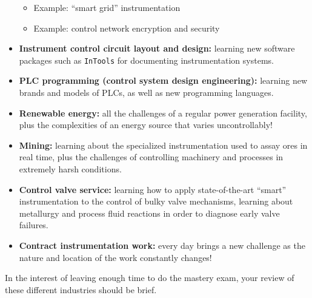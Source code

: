 \begin{itemize}
\begin{itemize}
\item{} Example: ``smart grid'' instrumentation
\item{} Example: control network encryption and security
\end{itemize}
\item{} {\bf Instrument control circuit layout and design:} learning new software packages such as {\tt InTools} for documenting instrumentation systems.
\item{} {\bf PLC programming (control system design engineering):} learning new brands and models of PLCs, as well as new programming languages.
\item{} {\bf Renewable energy:} all the challenges of a regular power generation facility, plus the complexities of an energy source that varies uncontrollably!
\item{} {\bf Mining:} learning about the specialized instrumentation used to assay ores in real time, plus the challenges of controlling machinery and processes in extremely harsh conditions.
\item{} {\bf Control valve service:} learning how to apply state-of-the-art ``smart'' instrumentation to the control of bulky valve mechanisms, learning about metallurgy and process fluid reactions in order to diagnose early valve failures.  
\item{} {\bf Contract instrumentation work:} every day brings a new challenge as the nature and location of the work constantly changes!
\end{itemize}

In the interest of leaving enough time to do the mastery exam, your review of these different industries should be brief.




